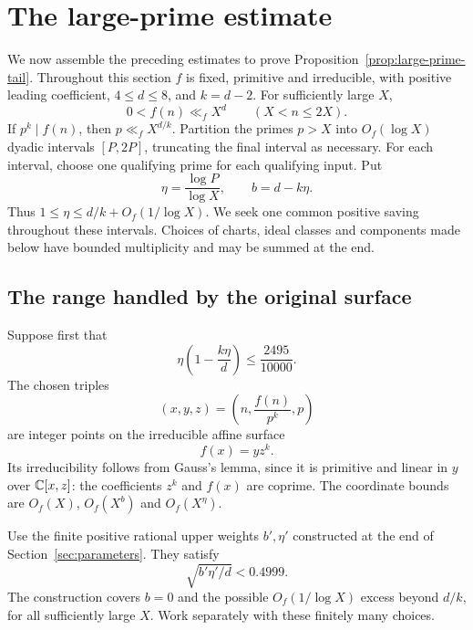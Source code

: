 \section{The large-prime estimate}
\label{sec:tail-proof}

We now assemble the preceding estimates to prove
Proposition~\ref{prop:large-prime-tail}. Throughout this section $f$ is
fixed, primitive and irreducible, with positive leading coefficient,
$4\le d\le8$, and $k=d-2$. For sufficiently large $X$,
\[
 0<f(n)\ll_f X^d\qquad(X<n\le2X).
\]
If $p^k\mid f(n)$, then $p\ll_f X^{d/k}$. Partition the primes $p>X$
into $O_f(\log X)$ dyadic intervals $[P,2P]$, truncating the final interval
as necessary. For each interval, choose one qualifying prime for each
qualifying input. Put
\[
 \eta=\frac{\log P}{\log X},\qquad b=d-k\eta.
\]
Thus $1\le\eta\le d/k+O_f(1/\log X)$. We seek one common positive
saving throughout these intervals. Choices of charts, ideal classes
and components made below have bounded multiplicity and may be
summed at the end.

\subsection{The range handled by the original surface}

Suppose first that
\begin{equation}
 \eta\left(1-\frac{k\eta}{d}\right)\le\frac{2495}{10000}.
 \label{eq:tail-direct-range}
\end{equation}
The chosen triples
\[
 (x,y,z)=\left(n,\frac{f(n)}{p^k},p\right)
\]
are integer points on the irreducible affine surface
\begin{equation}
 f(x)=yz^k.
 \label{eq:tail-direct-surface}
\end{equation}
Its irreducibility follows from Gauss's lemma, since it is primitive
and linear in $y$ over $\mathbb C[x,z]$: the coefficients $z^k$ and $f(x)$
are coprime. The coordinate bounds are $O_f(X)$, $O_f(X^b)$ and
$O_f(X^\eta)$.

Use the finite positive rational upper weights $b',\eta'$ constructed
at the end of Section~\ref{sec:parameters}. They satisfy
\begin{equation}
 \sqrt{b'\eta'/d}<0.4999.
 \label{eq:tail-direct-margin}
\end{equation}
The construction covers $b=0$ and the possible
$O_f(1/\log X)$ excess beyond $d/k$, for all sufficiently large $X$.
Work separately with these finitely many choices.


